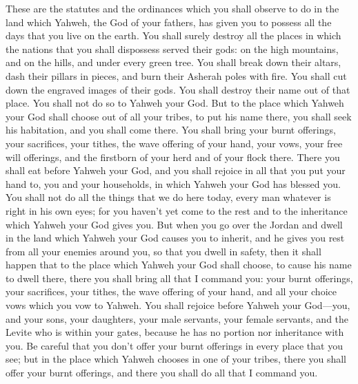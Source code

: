  These are the statutes and the ordinances which you shall
observe to do in the land which Yahweh, the God of your fathers, has
given you to possess all the days that you live on the earth.
 You shall surely destroy all the places in which the
nations that you shall dispossess served their gods: on the high
mountains, and on the hills, and under every green tree. 
You shall break down their altars, dash their pillars in pieces, and
burn their Asherah poles with fire. You shall cut down the engraved
images of their gods. You shall destroy their name out of that place.
 You shall not do so to Yahweh your God. 
But to the place which Yahweh your God shall choose out of all your
tribes, to put his name there, you shall seek his habitation, and you
shall come there.  You shall bring your burnt offerings,
your sacrifices, your tithes, the wave offering of your hand, your vows,
your free will offerings, and the firstborn of your herd and of your
flock there.  There you shall eat before Yahweh your God,
and you shall rejoice in all that you put your hand to, you and your
households, in which Yahweh your God has blessed you.  You
shall not do all the things that we do here today, every man whatever is
right in his own eyes;  for you haven't yet come to the
rest and to the inheritance which Yahweh your God gives you.
 But when you go over the Jordan and dwell in the land
which Yahweh your God causes you to inherit, and he gives you rest from
all your enemies around you, so that you dwell in safety,
 then it shall happen that to the place which Yahweh your
God shall choose, to cause his name to dwell there, there you shall
bring all that I command you: your burnt offerings, your sacrifices,
your tithes, the wave offering of your hand, and all your choice vows
which you vow to Yahweh.  You shall rejoice before Yahweh
your God---you, and your sons, your daughters, your male servants, your
female servants, and the Levite who is within your gates, because he has
no portion nor inheritance with you.  Be careful that you
don't offer your burnt offerings in every place that you see;
 but in the place which Yahweh chooses in one of your
tribes, there you shall offer your burnt offerings, and there you shall
do all that I command you.

